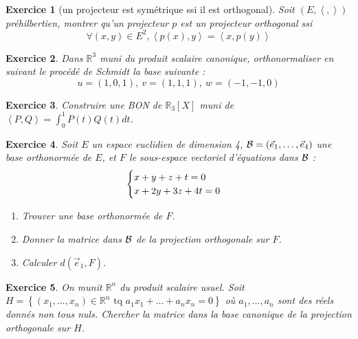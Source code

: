\documentclass[12pt,a4paper]{article}
\newcommand{\ps}[2]{\left\langle#1,#2\right\rangle}
\newcommand{\R}{\mathbb{R}}
\theoremstyle{break}
\newtheorem{Exo}{Exercice}
\begin{document}
\begin{Exo}[un projecteur est symétrique ssi il est orthogonal]
Soit $(E,\ps{}{})$ préhilbertien, montrer qu'un projecteur $p$ est un projecteur orthogonal ssi $$\forall (x,y)\in E^2,\ps{p(x)}{y}=\ps{x}{p(y)}$$
\end{Exo}


%
%
%    
%


\begin{Exo}
Dans $\mathbb R^3$ muni du produit scalaire canonique, orthonormaliser en suivant le procédé de Schmidt la base suivante :
$$u=(1,0,1),\ v=(1,1,1),\ w=(-1,-1,0)$$
\end{Exo}

\begin{Exo}
Construire une BON de $\R_3[X]$ muni de $\ps{P}{Q}=\int_0^1P(t)Q(t)dt$.
\end{Exo}

\begin{Exo}
Soit $E$ un espace euclidien de dimension 4, ${\cal B} = (\vec e_1, \dots, \vec e_4)$
une base orthonormée de $E$, et $F$ le sous-espace vectoriel d'équations dans $\cal B$ :
$$\begin{cases} x+y+z+t = 0\cr x+2y+3z+4t =0 \cr\end{cases}$$

\begin{enumerate}
  \item Trouver une base orthonormée de $F$.
  \item Donner la matrice dans $\cal B$ de la projection orthogonale sur $F$.
  \item Calculer $d(\vec e_1, F)$.
\end{enumerate}
\end{Exo}



\begin{Exo}
On munit $\R^n$ du produit scalaire usuel.
Soit $H = \left \{ (x_1,\dots,x_n) \in \R^n \text{ tq } a_1x_1 + \dots + a_nx_n = 0\right \}$
où $a_1,\dots,a_n$ sont des réels donnés non tous nuls.
Chercher la matrice dans la base canonique de la projection orthogonale
sur $H$.

\end{Exo}
\end{document}
